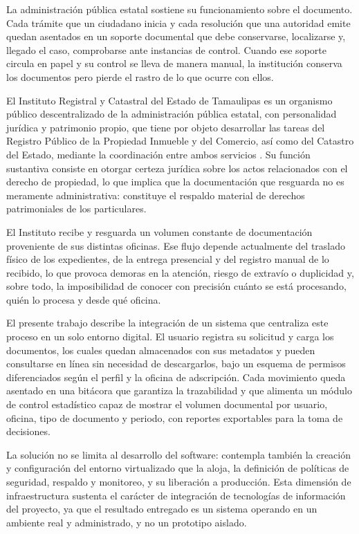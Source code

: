 La administración pública estatal sostiene su funcionamiento sobre el documento. Cada trámite que un ciudadano inicia y cada resolución que una autoridad emite quedan asentados en un soporte documental que debe conservarse, localizarse y, llegado el caso, comprobarse ante instancias de control. Cuando ese soporte circula en papel y su control se lleva de manera manual, la institución conserva los documentos pero pierde el rastro de lo que ocurre con ellos.

El Instituto Registral y Catastral del Estado de Tamaulipas es un organismo público descentralizado de la administración pública estatal, con personalidad jurídica y patrimonio propio, que tiene por objeto desarrollar las tareas del Registro Público de la Propiedad Inmueble y del Comercio, así como del Catastro del Estado, mediante la coordinación entre ambos servicios \cite{poe2022irct}. Su función sustantiva consiste en otorgar certeza jurídica sobre los actos relacionados con el derecho de propiedad, lo que implica que la documentación que resguarda no es meramente administrativa: constituye el respaldo material de derechos patrimoniales de los particulares.

El Instituto recibe y resguarda un volumen constante de documentación proveniente de sus distintas oficinas. Ese flujo depende actualmente del traslado físico de los expedientes, de la entrega presencial y del registro manual de lo recibido, lo que provoca demoras en la atención, riesgo de extravío o duplicidad y, sobre todo, la imposibilidad de conocer con precisión cuánto se está procesando, quién lo procesa y desde qué oficina.

El presente trabajo describe la integración de un sistema que centraliza este proceso en un solo entorno digital. El usuario registra su solicitud y carga los documentos, los cuales quedan almacenados con sus metadatos y pueden consultarse en línea sin necesidad de descargarlos, bajo un esquema de permisos diferenciados según el perfil y la oficina de adscripción. Cada movimiento queda asentado en una bitácora que garantiza la trazabilidad y que alimenta un módulo de control estadístico capaz de mostrar el volumen documental por usuario, oficina, tipo de documento y periodo, con reportes exportables para la toma de decisiones.

La solución no se limita al desarrollo del software: contempla también la creación y configuración del entorno virtualizado que la aloja, la definición de políticas de seguridad, respaldo y monitoreo, y su liberación a producción. Esta dimensión de infraestructura sustenta el carácter de integración de tecnologías de información del proyecto, ya que el resultado entregado es un sistema operando en un ambiente real y administrado, y no un prototipo aislado.

